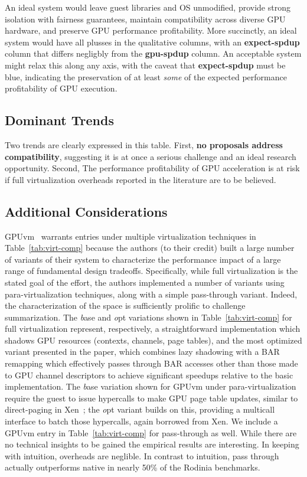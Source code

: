 An ideal system would leave guest libraries and OS unmodified, provide strong isolation
with fairness guarantees, maintain compatibility across diverse GPU hardware, and preserve
GPU performance profitability. More succinctly, an ideal system would have all plusses
in the qualitative columns, with an {\bf expect-spdup} column that differs negligbly from
the {\bf gpu-spdup} column. An acceptable system might relax this along any axis, with
the caveat that {\bf expect-spdup} must be blue, indicating the preservation of at least
{\it some} of the expected performance profitability of GPU execution.

\subsection{Dominant Trends}

Two trends are clearly expressed in this table. First, {\bf no proposals address compatibility},
suggesting it is at once a serious challenge and an ideal research opportunity. Second,
The performance profitability of GPU acceleration is at risk if full virtualization overheads
reported in the literature are to be believed.

\subsection{Additional Considerations}

GPUvm~\cite{GPUvm} warrants entries under multiple virtualization techniques in Table~\ref{tab:virt-comp}
because the authors (to their credit) built a large number of variants of their system to characterize
the performance impact of a large range of fundamental design tradeoffs. Specifically, while full virtualization
is the stated goal of the effort, the authors implemented a number of variants using para-virtualization techniques,
along with a simple pass-through variant. Indeed, the characterization of the space is sufficiently prolific to
challenge summarization. The {\emph base} and {\emph opt} variations shown in Table~\ref{tab:virt-comp}
for full virtualization represent, respectively, a straightforward implementation which shadows GPU
resources (contexts, channels, page tables), and the most optimized variant presented in the paper,
which combines lazy shadowing with a BAR remapping which effectively passes through BAR accesses other
than those made to GPU channel descriptors to achieve significant speedups relative to the basic implementation.
The {\emph base} variation shown for GPUvm under para-virtualization require the guest to issue hypercalls
to make GPU page table updates, similar to direct-paging in Xen~\cite{xen}; the {\emph opt} variant
builds on this, providing a multicall interface to batch those hypercalls, again borrowed from Xen.
We include a GPUvm entry in Table~\ref{tab:virt-comp} for pass-through as well. While there are no technical
insights to be gained the empirical results are interesting. In keeping with intuition, overheads are neglible.
In contrast to intuition, pass through actually outperforms native in nearly 50\% of the Rodinia benchmarks.

